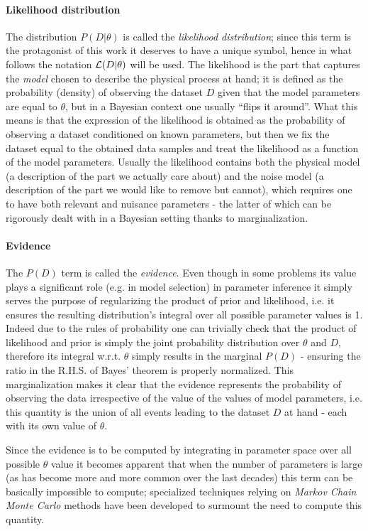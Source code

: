 \paragraph{Likelihood distribution}
The distribution $P(D|\theta)$ is called the \emph{likelihood distribution}; since this term is the protagonist of this work it deserves to have a unique symbol, hence in what follows the notation $\mathcal{L}(D|\theta)$ will be used. The likelihood is the part that captures the \emph{model} chosen to describe the physical process at hand; it is defined as the probability (density) of observing the dataset $D$ given that the model parameters are equal to $\theta$, but in a Bayesian context one usually ``flips it around''. What this means is that the expression of the likelihood is obtained as the probability of observing a dataset conditioned on known parameters, but then we fix the dataset equal to the obtained data samples and treat the likelihood as a function of the model parameters. Usually the likelihood contains both the physical model (a description of the part we actually care about) and the noise model (a description of the part we would like to remove but cannot), which requires one to have both relevant and nuisance parameters - the latter of which can be rigorously dealt with in a Bayesian setting thanks to marginalization.

\paragraph{Evidence}
The $P(D)$ term is called the \emph{evidence}. Even though in some problems its value plays a significant role (e.g. in model selection) in parameter inference it simply serves the purpose of regularizing the product of prior and likelihood, i.e. it ensures the resulting distribution's integral over all possible parameter values is 1. Indeed due to the rules of probability one can trivially check that the product of likelihood and prior is simply the joint probability distribution over $\theta$ and $D$, therefore its integral w.r.t. $\theta$ simply results in the marginal $P(D)$ - ensuring the ratio in the R.H.S. of Bayes' theorem is properly normalized. This marginalization makes it clear that the evidence represents the probability of observing the data irrespective of the value of the values of model parameters, i.e. this quantity is the union of all events leading to the dataset $D$ at hand - each with its own value of $\theta$.

Since the evidence is to be computed by integrating in parameter space over all possible $\theta$ value it becomes apparent that when the number of parameters is large (as has become more and more common over the last decades) this term can be basically impossible to compute; specialized techniques relying on \emph{Markov Chain Monte Carlo} methods have been developed to surmount the need to compute this quantity.

